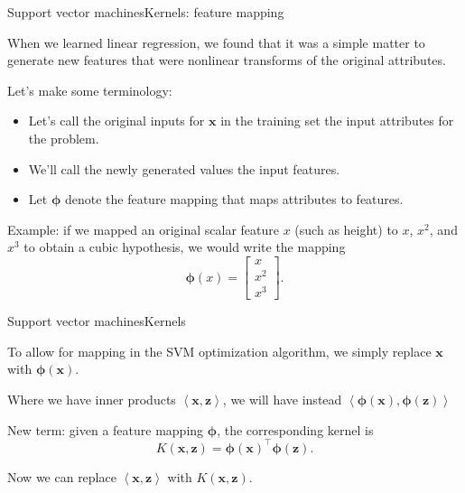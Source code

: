 \documentclass{beamer}
\renewcommand{\vec}[1]{\boldsymbol{#1}}
\begin{document}
\begin{frame}{Support vector machines}{Kernels: feature mapping}

  When we learned linear regression, we found that it was a simple
  matter to generate new features that were nonlinear transforms of
  the original attributes.

  \medskip

  Let's make some terminology:
  \begin{itemize}
  \item Let's call the original inputs for $\vec{x}$ in the training
    set the input \alert{attributes} for the problem.
  \item We'll call the newly generated values the input \alert{features}.
  \item Let $\vec{\phi}$ denote the \alert{feature mapping} that maps attributes
    to features.
  \end{itemize}

  \medskip

  Example: if we mapped an original scalar feature $x$ (such as height)
  to $x$, $x^2$, and $x^3$ to obtain a cubic hypothesis, we would write
  the mapping
  \[ \vec{\phi}(x) = \begin{bmatrix} x \\ x^2 \\ x^3 \end{bmatrix} .\]

\end{frame}


\begin{frame}{Support vector machines}{Kernels}

  To allow for mapping in the SVM optimization algorithm, we simply
  replace $\vec{x}$ with $\vec{\phi}(\vec{x})$.

  \medskip

  Where we have inner products $\left< \vec{x}, \vec{z} \right>$, we
  will have instead $\left< \vec{\phi}(\vec{x}),\vec{\phi}(\vec{z})
  \right>$

  \medskip

  New term: given a feature mapping $\vec{\phi}$, the corresponding
  \alert{kernel} is
  \[ K(\vec{x},\vec{z}) = \vec{\phi}(\vec{x})^\top\vec{\phi}(\vec{z}) .\]

  \medskip

  Now we can replace $\left< \vec{x}, \vec{z} \right>$ with
  $K(\vec{x},\vec{z})$.

\end{frame}
\end{document}
